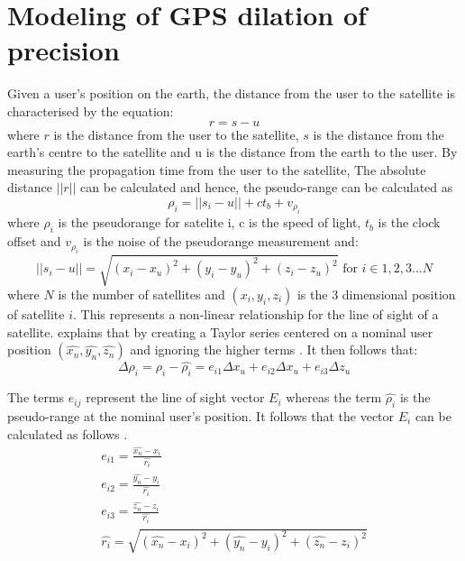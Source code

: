 \section{Modeling of GPS dilation of precision}
\label{appendix:GPS_DOP}
 Given a user's position on the earth, the distance from the user to the satellite is characterised by the equation:
\begin{equation}
	r =  s - u
\end{equation}
where $r$ is the distance from the user to the satellite, $s$ is the distance from the earth's centre to the satellite and u is the distance from the earth to the user. By measuring the propagation time from the user to the satellite, The absolute distance $||r||$ can be calculated and hence, the pseudo-range can be calculated as
\begin{equation}
	\rho_i = ||s_i-u||+ct_b + v_{\rho_i}
\end{equation}
where $\rho_i$ is the pseudorange for satelite i, c is the speed of light, $t_b$ is  the clock offset and $v_{\rho_i}$ is the noise of the pseudorange measurement and:
\begin{equation}
	||s_i-u|| = \sqrt{(x_i - x_u)^2+(y_i-y_u)^2+(z_i-z_u)^2} \text{ for } i \in 1,2,3...N \label{los}
\end{equation}
where $N$ is the number of satellites and $(x_i,y_i,z_i)$ is the 3 dimensional position of satellite $i$. This represents a non-linear relationship for the line of sight of a satellite.  \textcite{jwo2001efficient} explains that by creating a Taylor series centered on a nominal user position $(\hat{x_n},\hat{y_n},\hat{z_n})$ and ignoring the higher terms \cite{jwo2001efficient}. It then follows that:
\begin{equation}
	\Delta\rho_i = \rho_i - \hat{\rho_i} = e_{i1}\Delta x_u + e_{i2}\Delta x_u +  e_{i3}\Delta z_u
\end{equation}

The terms $e_{ij}$ represent the line of sight vector $E_i$ whereas the term $\hat{\rho_i}$ is the pseudo-range at the nominal user's position. It follows that the vector $E_i$ can be calculated as follows \cite{jwo2001efficient}.
\begin{subequations}
	\begin{align}
		e_{i1} = \frac{\hat{x_n} - x_i}{\hat{r_i}}\\
		e_{i2} = \frac{\hat{y_n} - y_i}{\hat{r_i}}\\
		e_{i3} = \frac{\hat{z_n} - z_i}{\hat{r_i}}\\
		\hat{r_i} = \sqrt{(\hat{x_n} - x_i)^2+(\hat{y_n} -y_i)^2+(\hat{z_n} -z_i)^2}
	\end{align}
\end{subequations}

